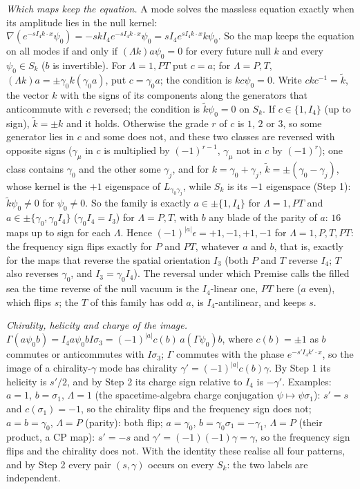 \emph{Which maps keep the equation.} A mode solves the massless equation exactly when its amplitude lies in the null kernel: $\nabla(e^{-sI_{4}k\cdot x}\psi_{0}) = -sk I_{4}e^{-sI_{4}k\cdot x}\psi_{0} = sI_{4}e^{sI_{4}k\cdot x}k\psi_{0}$. So the map keeps the equation on all modes if and only if $(\Lambda k)a\psi_{0} = 0$ for every future null $k$ and every $\psi_{0} \in S_{k}$ ($b$ is invertible). For $\Lambda = 1, PT$ put $c = a$; for $\Lambda = P, T$, $(\Lambda k)a = \pm\gamma_{0}k(\gamma_{0}a)$, put $c = \gamma_{0}a$; the condition is $kc\psi_{0} = 0$. Write $ckc^{-1} = \tilde k$, the vector $k$ with the signs of its components along the generators that anticommute with $c$ reversed; the condition is $\tilde k\psi_{0} = 0$ on $S_{k}$. If $c \in \{1, I_{4}\}$ (up to sign), $\tilde k = \pm k$ and it holds. Otherwise the grade $r$ of $c$ is $1$, $2$ or $3$, so some generator lies in $c$ and some does not, and these two classes are reversed with opposite signs ($\gamma_{\mu}$ in $c$ is multiplied by $(-1)^{r-1}$, $\gamma_{\mu}$ not in $c$ by $(-1)^{r}$); one class contains $\gamma_{0}$ and the other some $\gamma_{j}$, and for $k = \gamma_{0} + \gamma_{j}$, $\tilde k = \pm(\gamma_{0} - \gamma_{j})$, whose kernel is the $+1$ eigenspace of $L_{\gamma_{0}\gamma_{j}}$, while $S_{k}$ is its $-1$ eigenspace (Step 1): $\tilde k\psi_{0} \ne 0$ for $\psi_{0} \ne 0$. So the family is exactly $a \in \pm\{1, I_{4}\}$ for $\Lambda = 1, PT$ and $a \in \pm\{\gamma_{0}, \gamma_{0}I_{4}\}$ ($\gamma_{0}I_{4} = I_{3}$) for $\Lambda = P, T$, with $b$ any blade of the parity of $a$: $16$ maps up to sign for each $\Lambda$. Hence $(-1)^{|a|}\epsilon = +1, -1, +1, -1$ for $\Lambda = 1, P, T, PT$: the frequency sign flips exactly for $P$ and $PT$, whatever $a$ and $b$, that is, exactly for the maps that reverse the spatial orientation $I_{3}$ (both $P$ and $T$ reverse $I_{4}$; $T$ also reverses $\gamma_{0}$, and $I_{3} = \gamma_{0}I_{4}$). The reversal under which Premise  calls the filled sea the time reverse of the null vacuum is the $I_{4}$-linear one, $PT$ here ($a$ even), which flips $s$; the $T$ of this family has odd $a$, is $I_{4}$-antilinear, and keeps $s$.

\emph{Chirality, helicity and charge of the image.} $\Gamma(a\psi_{0}b) = I_{4}a\psi_{0}bI\sigma_{3} = (-1)^{|a|}c(b)\,a(\Gamma\psi_{0})b$, where $c(b) = \pm 1$ as $b$ commutes or anticommutes with $I\sigma_{3}$; $\Gamma$ commutes with the phase $e^{-s'I_{4}k'\cdot x}$, so the image of a chirality-$\gamma$ mode has chirality $\gamma' = (-1)^{|a|}c(b)\gamma$. By Step 1 its helicity is $s'/2$, and by Step 2 its charge sign relative to $I_{4}$ is $-\gamma'$. Examples: $a = 1$, $b = \sigma_{1}$, $\Lambda = 1$ (the spacetime-algebra charge conjugation $\psi \mapsto \psi\sigma_{1}$): $s' = s$ and $c(\sigma_{1}) = -1$, so the chirality flips and the frequency sign does not; $a = b = \gamma_{0}$, $\Lambda = P$ (parity): both flip; $a = \gamma_{0}$, $b = \gamma_{0}\sigma_{1} = -\gamma_{1}$, $\Lambda = P$ (their product, a CP map): $s' = -s$ and $\gamma' = (-1)(-1)\gamma = \gamma$, so the frequency sign flips and the chirality does not. With the identity these realise all four patterns, and by Step 2 every pair $(s, \gamma)$ occurs on every $S_{k}$: the two labels are independent.

